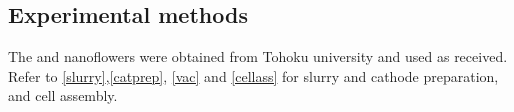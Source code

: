 \subsection{Experimental methods}
The  and  nanoflowers were obtained from Tohoku university and used as received. Refer to \ref{slurry},\ref{catprep}, \ref{vac} and \ref{cellass} for slurry and cathode preparation, and cell assembly. 

